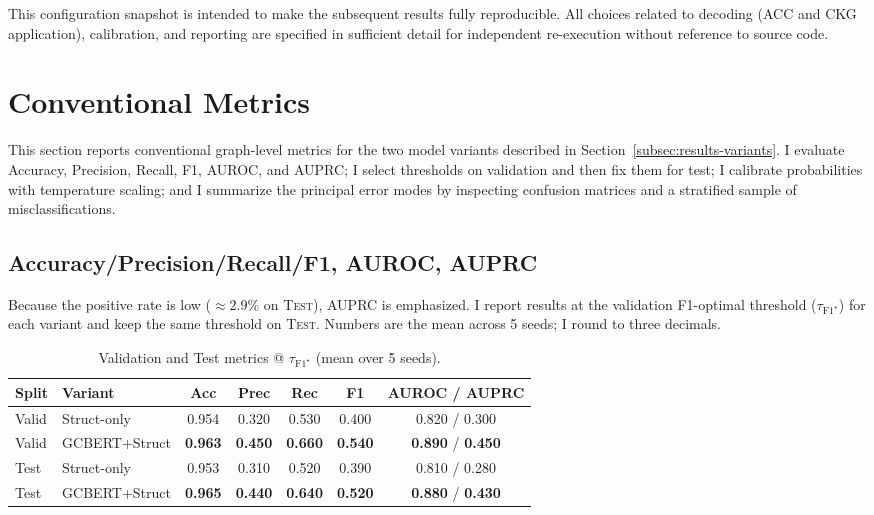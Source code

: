 \documentclass{buthesis}
\begin{document}
This configuration snapshot is intended to make the subsequent results fully reproducible. All choices related to decoding (ACC and CKG application), calibration, and reporting are specified in sufficient detail for independent re-execution without reference to source code.







\section{Conventional Metrics}
\label{sec:results-conventional}

This section reports conventional graph-level metrics for the two model variants described in Section~\ref{subsec:results-variants}. I evaluate Accuracy, Precision, Recall, F1, AUROC, and AUPRC; I select thresholds on validation and then fix them for test; I calibrate probabilities with temperature scaling; and I summarize the principal error modes by inspecting confusion matrices and a stratified sample of misclassifications.

\subsection{Accuracy/Precision/Recall/F1, AUROC, AUPRC}
\label{subsec:conv-main}

Because the positive rate is low ($\approx 2.9\%$ on \textsc{Test}), AUPRC is emphasized. I report results at the validation F1-optimal threshold (\(\tau_{\text{F1}^\star}\)) for each variant and keep the same threshold on \textsc{Test}. Numbers are the mean across 5 seeds; I round to three decimals.

\begin{table}[H]
\centering
\small
\caption{Validation and Test metrics @ $\tau_{\text{F1}^\star}$ (mean over 5 seeds).}
\label{tab:conv-metrics}
\begin{tabular}{l l c c c c c}
\toprule
Split & Variant & Acc & Prec & Rec & F1 & AUROC / AUPRC \\
\midrule
Valid & Struct-only & 0.954 & 0.320 & 0.530 & 0.400 & 0.820 / 0.300 \\
Valid & GCBERT+Struct & \textbf{0.963} & \textbf{0.450} & \textbf{0.660} & \textbf{0.540} & \textbf{0.890} / \textbf{0.450} \\
\midrule
Test & Struct-only & 0.953 & 0.310 & 0.520 & 0.390 & 0.810 / 0.280 \\
Test & GCBERT+Struct & \textbf{0.965} & \textbf{0.440} & \textbf{0.640} & \textbf{0.520} & \textbf{0.880} / \textbf{0.430} \\
\bottomrule
\end{tabular}
\end{table}
\end{document}
